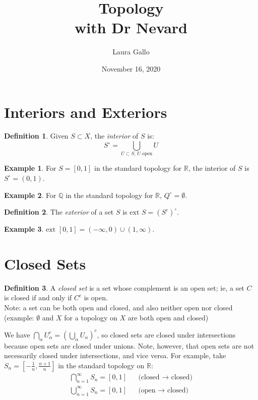 \documentclass{article}
\title{Topology \\ with Dr Nevard}
\author{Laura Gallo}
\date{November 16, 2020}
\theoremstyle{definition}
\newtheorem{definition}{Definition}
\newtheorem{exampled}{Example}[definition]
\begin{document}
\maketitle

\section{Interiors and Exteriors}
\begin{definition}
	Given $S \subset X$, the \emph{interior} of $S$ is:
	$$S^\circ=\bigcup_\text{$U \subset S$, $U$ open}U$$
\end{definition}
\begin{exampled}
	For $S=[0, 1]$ in the standard topology for $\mathbb{R}$, the interior of $S$ is $S^\circ=(0, 1)$.
\end{exampled}
\begin{exampled}
	For $\mathbb{Q}$ in the standard topology for $\mathbb{R}$, $Q^\circ=\emptyset$.
\end{exampled}

\begin{definition}
	The \emph{exterior} of a set $S$ is $\text{ext } S =(S^c)^\circ$.
\end{definition}
\begin{exampled}
	$\text{ext } [0, 1] = (-\infty, 0) \cup (1, \infty)$.
\end{exampled}

\section{Closed Sets}
\begin{definition}
	A \emph{closed set} is a set whose complement is an open set; ie, a set $C$ is closed if and only if $C^c$ is open. \\
	Note: a set can be both open and closed, and also neither open nor closed (example: $\emptyset$ and $X$ for a topology on $X$ are both open and closed)
\end{definition}
\noindent
We have $\bigcap_\alpha U_\alpha^c=(\bigcup_\alpha U_\alpha)^c$, so closed sets are closed under intersections because open sets are closed under unions. Note, however, that open sets are not necessarily closed under intersections, and vice versa. For example, take $S_n=[-\frac{1}{n}, \frac{n+1}{n}]$ in the standard topology on $\mathbb{R}$:
\begin{align*}
	\bigcap_{n=1}^\infty S_n = [0, 1] && \text{(closed $\rightarrow$ closed)} \\
	\bigcup_{n=1}^\infty S_n = [0, 1] && \text{(open $\rightarrow$ closed)} \\
\end{align*}
\end{document}
